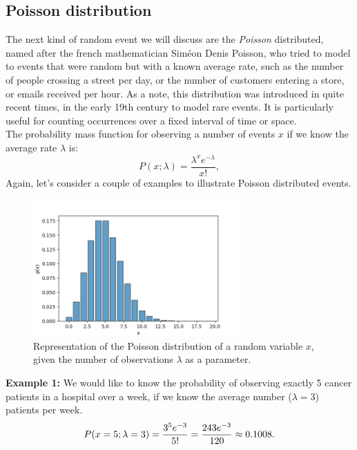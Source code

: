 \documentclass{book}
\begin{document}
\newpage

\subsection{Poisson distribution}
The next kind of random event we will discuss are the \textit{Poisson} distributed, named after the french mathematician Sim\'eon Denis Poisson, who tried to model to events that were random but with a known average rate, such as the number of people crossing a street per day, or the number of customers entering a store, or emails received per hour.
As a note, this distribution was introduced in quite recent times, in the early 19th century to model rare events. It is particularly useful for counting occurrences over a fixed interval of time or space.\\

The probability mass function for observing a number of events $x$ if we know the average rate $\lambda$ is:
\begin{equation}
    P(x; \lambda) = \frac{\lambda^x e^{-\lambda}}{x!},
\end{equation}
Again, let's consider a couple of examples to illustrate Poisson distributed events.

\begin{figure}[ht]
    \centering
    \includegraphics[width=0.7\textwidth]{figures/chapter2/poisson.png}
    \caption{Representation of the Poisson distribution of a random variable $x$, given the number of observations $\lambda$ as a parameter.}
    \label{fig:poisson1}
\end{figure}

\textbf{Example 1:} We would like to know the probability of observing exactly 5 cancer patients in a hospital over a week, if we know the average number ($\lambda = 3$) patients per week.
\begin{equation}
    P(x=5; \lambda = 3) = \frac{3^5 e^{-3}}{5!} = \frac{243 e^{-3}}{120} \approx 0.1008. \notag
\end{equation}\\
\end{document}

